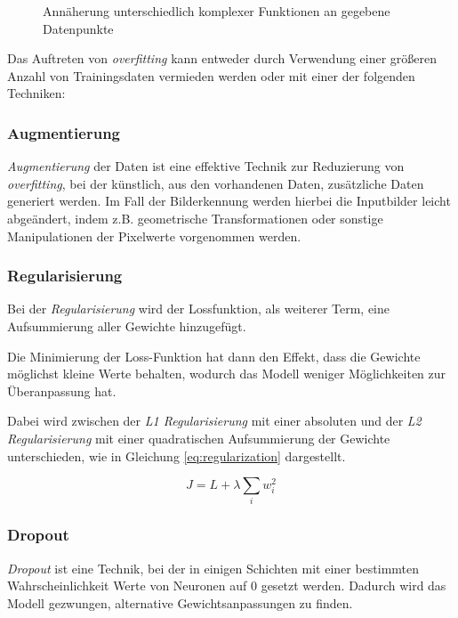 \vspace{1cm}
\begin{figure}[H]
    \centering
    \def\svgwidth{\textwidth}
    
    \caption{Annäherung unterschiedlich komplexer
    Funktionen an gegebene 
        Datenpunkte}
    \label{fig:over_under_fit}
\end{figure}
\vspace{1cm}

Das Auftreten von \textit{\Gls{overfitting}} kann entweder durch 
Verwendung einer größeren Anzahl von Trainingsdaten vermieden werden 
oder mit einer der folgenden Techniken:


\subsubsection{Augmentierung}

\textit{Augmentierung} der Daten ist eine effektive Technik 
zur Reduzierung von \textit{\Gls{overfitting}}, bei der künstlich,
aus den vorhandenen Daten, zusätzliche Daten generiert werden. 
Im Fall der Bilderkennung werden hierbei 
die Inputbilder leicht abgeändert, indem z.B. geometrische 
Transformationen oder sonstige Manipulationen der Pixelwerte 
vorgenommen werden.


\subsubsection{Regularisierung}

Bei der \textit{Regularisierung} wird der Lossfunktion,
als weiterer Term, eine Aufsummierung aller Gewichte
hinzugefügt.

Die Minimierung der Loss-Funktion hat dann den Effekt, dass
die Gewichte möglichst 
kleine Werte behalten, wodurch das Modell weniger
Möglichkeiten zur Überanpassung hat.

Dabei wird zwischen der \textit{L1 Regularisierung}
mit einer absoluten und der \textit{L2 Regularisierung} mit einer 
quadratischen Aufsummierung der
Gewichte unterschieden, wie in Gleichung \ref{eq:regularization}
dargestellt.

\begin{equation}
    \label{eq:regularization}
    J = L + \lambda \sum_{i} w_{i}^{2}
\end{equation}


\subsubsection{Dropout}
\textit{Dropout} ist eine Technik, bei der in einigen Schichten 
mit einer bestimmten Wahrscheinlichkeit Werte von 
Neuronen auf 0 gesetzt werden.
Dadurch wird das Modell gezwungen, alternative
Gewichtsanpassungen zu finden.

